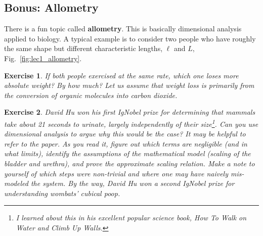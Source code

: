 \documentclass[
  11pt,
	colorful,
	raggedright,
]{tufte-style-thesis-flip}
\newtheorem{exercise}{Exercise}[section]
\begin{document}
\subsection{Bonus: Allometry}

There is a fun topic called \textbf{allometry}. This is basically dimensional analysis applied to biology. A typical example is to consider two people who have roughly the same shape but different characteristic lengths, $\ell$ and $L$, Fig.~\ref{fig:lec1_allometry}.


\begin{exercise}
If both people exercised at the same rate, which one loses more absolute weight? By how much? Let us assume that weight loss is primarily from the conversion of organic molecules into carbon dioxide. 
\end{exercise}

\begin{exercise}
David Hu won his first IgNobel prize for determining that mammals take about 21 seconds to urinate, largely independently of their size\footnote{I learned about this in his excellent popular science book, \emph{How To Walk on Water and Climb Up Walls}.}. Can you use dimensional analysis to argue why this would be the case? It may be helpful to refer to the paper. As you read it, figure out which terms are negligible (and in what limits), identify the assumptions of the mathematical model (scaling of the bladder and urethra), and prove the approximate scaling relation. Make a note to yourself of which steps were non-trivial and where one may have naively mis-modeled the system. By the way, David Hu won a second IgNobel prize for understanding wombats' cubical poop.
\end{exercise}
\end{document}
